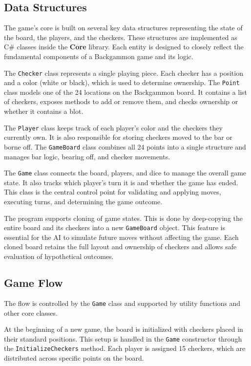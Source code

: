\subsection{Data Structures}

The game's core is built on several key data structures representing the state of the board, the players, and the checkers. These structures are implemented as C\# classes inside the \textbf{Core} library. Each entity is designed to closely reflect the fundamental components of a Backgammon game and its logic.

The \texttt{Checker} class represents a single playing piece. Each checker has a position and a color (white or black), which is used to determine ownership. The \texttt{Point} class models one of the 24 locations on the Backgammon board. It contains a list of checkers, exposes methods to add or remove them, and checks ownership or whether it contains a blot.

The \texttt{Player} class keeps track of each player's color and the checkers they currently own. It is also responsible for storing checkers moved to the bar or borne off. The \texttt{GameBoard} class combines all 24 points into a single structure and manages bar logic, bearing off, and checker movements.

The \texttt{Game} class connects the board, players, and dice to manage the overall game state. It also tracks which player's turn it is and whether the game has ended. This class is the central control point for validating and applying moves, executing turns, and determining the game outcome.

The program supports cloning of game states. This is done by deep-copying the entire board and its checkers into a new \texttt{GameBoard} object. This feature is essential for the AI to simulate future moves without affecting the game. Each cloned board retains the full layout and ownership of checkers and allows safe evaluation of hypothetical outcomes.

\subsection{Game Flow}

The flow is controlled by the \texttt{Game} class and supported by utility functions and other core classes.

At the beginning of a new game, the board is initialized with checkers placed in their standard positions. This setup is handled in the \texttt{Game} constructor through the \texttt{InitializeCheckers} method. Each player is assigned 15 checkers, which are distributed across specific points on the board.


